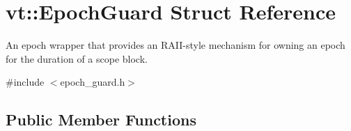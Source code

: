 \hypertarget{structvt_1_1_epoch_guard}{}\section{vt\+:\+:Epoch\+Guard Struct Reference}
\label{structvt_1_1_epoch_guard}


An epoch wrapper that provides an R\+A\+I\+I-\/style mechanism for owning an epoch for the duration of a scope block.  




{\ttfamily \#include $<$epoch\+\_\+guard.\+h$>$}

\subsection*{Public Member Functions}
